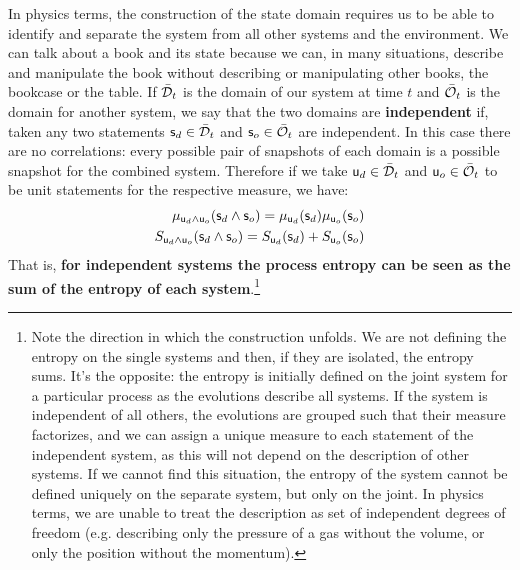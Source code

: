\documentclass[letterpaper]{article}
\begin{document}
In physics terms, the construction of the state domain requires us to be able to identify and separate the system from all other systems and the environment. We can talk about a book and its state because we can, in many situations, describe and manipulate the book without describing or manipulating other books, the bookcase or the table. If $\tdomain_{t}$ is the domain of our system at time $t$ and $\tdomain[O]_t$ is the domain for another system, we say that the two domains are \textbf{independent} if, taken any two statements $\stmt_d \in \tdomain_{t}$ and $\stmt_o \in \tdomain[O]_{t}$ are independent. In this case there are no correlations: every possible pair of snapshots of each domain is a possible snapshot for the combined system. Therefore if we take $\stmt[u]_d \in \tdomain_{t}$ and $\stmt[u]_o \in \tdomain[O]_{t}$ to be unit statements for the respective measure, we have:
\begin{equation}\label{entropy_sums}
\begin{aligned}
	\mu_{\stmt[u]_d \AND \stmt[u]_o}(\stmt_d \AND \stmt_o)=\mu_{\stmt[u]_d}(\stmt_d) \mu_{\stmt[u]_o}(\stmt_o) \\
S_{\stmt[u]_d \AND \stmt[u]_o}(\stmt_d \AND \stmt_o)=S_{\stmt[u]_d}(\stmt_d) + S_{\stmt[u]_o}(\stmt_o)
\end{aligned}
\end{equation} 
That is, \textbf{for independent systems the process entropy can be seen as the sum of the entropy of each system}.\footnote{Note the direction in which the construction unfolds. We are not defining the entropy on the single systems and then, if they are isolated, the entropy sums. It's the opposite: the entropy is initially defined on the joint system for a particular process as the evolutions describe all systems. If the system is independent of all others, the evolutions are grouped such that their measure factorizes, and we can assign a unique measure to each statement of the independent system, as this will not depend on the description of other systems. If we cannot find this situation, the entropy of the system cannot be defined uniquely on the separate system, but only on the joint. In physics terms, we are unable to treat the description as set of independent degrees of freedom (e.g. describing only the pressure of a gas without the volume, or only the position without the momentum).}
\end{document}
